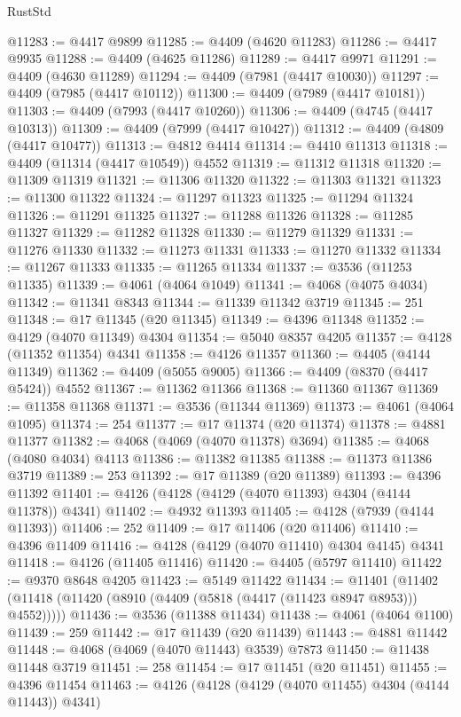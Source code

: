 \begin{lexlean}{RustStd}
\begin{coremodule}
@11283 := @4417 @9899
@11285 := @4409 (@4620 @11283)
@11286 := @4417 @9935
@11288 := @4409 (@4625 @11286)
@11289 := @4417 @9971
@11291 := @4409 (@4630 @11289)
@11294 := @4409 (@7981 (@4417 @10030))
@11297 := @4409 (@7985 (@4417 @10112))
@11300 := @4409 (@7989 (@4417 @10181))
@11303 := @4409 (@7993 (@4417 @10260))
@11306 := @4409 (@4745 (@4417 @10313))
@11309 := @4409 (@7999 (@4417 @10427))
@11312 := @4409 (@4809 (@4417 @10477))
@11313 := @4812 @4414
@11314 := @4410 @11313
@11318 := @4409 (@11314 (@4417 @10549)) @4552
@11319 := @11312 @11318
@11320 := @11309 @11319
@11321 := @11306 @11320
@11322 := @11303 @11321
@11323 := @11300 @11322
@11324 := @11297 @11323
@11325 := @11294 @11324
@11326 := @11291 @11325
@11327 := @11288 @11326
@11328 := @11285 @11327
@11329 := @11282 @11328
@11330 := @11279 @11329
@11331 := @11276 @11330
@11332 := @11273 @11331
@11333 := @11270 @11332
@11334 := @11267 @11333
@11335 := @11265 @11334
@11337 := @3536 (@11253 @11335)
@11339 := @4061 (@4064 @1049)
@11341 := @4068 (@4075 @4034)
@11342 := @11341 @8343
@11344 := @11339 @11342 @3719
@11345 := 251
@11348 := @17 @11345 (@20 @11345)
@11349 := @4396 @11348
@11352 := @4129 (@4070 @11349) @4304
@11354 := @5040 @8357 @4205
@11357 := @4128 (@11352 @11354) @4341
@11358 := @4126 @11357
@11360 := @4405 (@4144 @11349)
@11362 := @4409 (@5055 @9005)
@11366 := @4409 (@8370 (@4417 @5424)) @4552
@11367 := @11362 @11366
@11368 := @11360 @11367
@11369 := @11358 @11368
@11371 := @3536 (@11344 @11369)
@11373 := @4061 (@4064 @1095)
@11374 := 254
@11377 := @17 @11374 (@20 @11374)
@11378 := @4881 @11377
@11382 := @4068 (@4069 (@4070 @11378) @3694)
@11385 := @4068 (@4080 @4034) @4113
@11386 := @11382 @11385
@11388 := @11373 @11386 @3719
@11389 := 253
@11392 := @17 @11389 (@20 @11389)
@11393 := @4396 @11392
@11401 := @4126 (@4128 (@4129 (@4070 @11393) @4304 (@4144 @11378)) @4341)
@11402 := @4932 @11393
@11405 := @4128 (@7939 (@4144 @11393))
@11406 := 252
@11409 := @17 @11406 (@20 @11406)
@11410 := @4396 @11409
@11416 := @4128 (@4129 (@4070 @11410) @4304 @4145) @4341
@11418 := @4126 (@11405 @11416)
@11420 := @4405 (@5797 @11410)
@11422 := @9370 @8648 @4205
@11423 := @5149 @11422
@11434 := @11401
    (@11402 (@11418 (@11420 (@8910 (@4409 (@5818 (@4417 (@11423 @8947 @8953))) @4552)))))
@11436 := @3536 (@11388 @11434)
@11438 := @4061 (@4064 @1100)
@11439 := 259
@11442 := @17 @11439 (@20 @11439)
@11443 := @4881 @11442
@11448 := @4068 (@4069 (@4070 @11443) @3539) @7873
@11450 := @11438 @11448 @3719
@11451 := 258
@11454 := @17 @11451 (@20 @11451)
@11455 := @4396 @11454
@11463 := @4126 (@4128 (@4129 (@4070 @11455) @4304 (@4144 @11443)) @4341)

\end{coremodule}
\end{lexlean}

